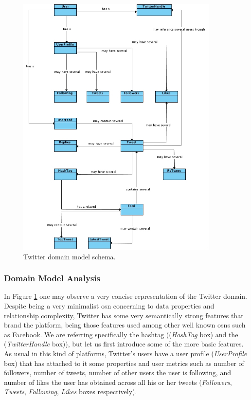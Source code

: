 \begin{figure}[h!]
  \hspace*{-0.4in}
  \includegraphics[width=0.9\textwidth]{img/twitter-domain-model.jpg}
\caption{\label{img:twitter} Twitter domain model schema.}
\end{figure}

\subsubsection*{Domain Model Analysis}
In Figure \ref{img:twitter} one may observe a very concise representation of the Twitter domain. Despite being a very minimalist \gls{osn}
concerning to data properties and relationship complexity, Twitter has some very semantically strong features that brand the platform, being those
features used among other well known \glspl{osn} such as Facebook. We are referring specifically the hashtag ((\textit{HashTag} box) and the (\textit{TwitterHandle} box)),
but let us first introduce some of the more basic features.\\

\indent As usual in this kind of platforms, Twitter's users have a user profile
(\textit{UserProfile} box) that has attached to it some properties and user metrics such as number of followers, number of tweets, number of other users the user is following, and number of likes the user has obtained across all his or her tweets (\textit{Followers}, \textit{Tweets}, \textit{Following}, \textit{Likes} boxes respectively).\\

